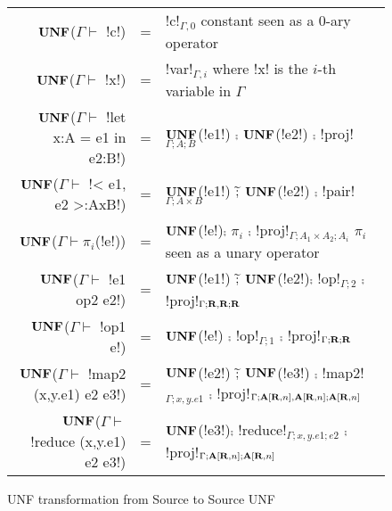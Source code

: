 \begin{figure*}[t]
    \begin{tabular}{r c l}
    $\mathbf{UNF}$($\Gamma\vdash $ !c!) &=& !c!$_{\Gamma,0}$ constant seen as a 0-ary operator\\
    $\mathbf{UNF}$($\Gamma\vdash $ !x!) &=& !var!$_{\Gamma,i}$ where !x! is the $i$-th variable in $\Gamma$ \\
    $\mathbf{UNF}$($\Gamma\vdash $ !let x:A = e1 in e2:B!) &=& $\mathbf{UNF}$(!e1!) $\comp$ $\mathbf{UNF}$(!e2!) $\comp$ !proj!$_{\Gamma;A;B}$  \\ 
    $\mathbf{UNF}$($\Gamma\vdash $ !< e1, e2 >:AxB!) &=& $\mathbf{UNF}$(!e1!) $\widetilde{;}$ $\mathbf{UNF}$(!e2!) $\comp$ !pair!$_{\Gamma;A\times B}$ \\ 
    $\mathbf{UNF}$($\Gamma\vdash \pi_i$(!e!)) &=& $\mathbf{UNF}$(!e!)$\comp $ $\pi_i$ $\comp$ !proj!$_{\Gamma;A_1\times A_2;A_i}$ $\pi_i$ seen as a unary operator\\
    $\mathbf{UNF}$($\Gamma\vdash $ !e1 op2 e2!) &=& $\mathbf{UNF}$(!e1!) $\widetilde{;}$ $\mathbf{UNF}$(!e2!)$\comp$ !op!$_{\Gamma;2}$ $\comp$ !proj!$_{\Gamma;\mathbf{R},\mathbf{R};\mathbf{R}}$ \\
    $\mathbf{UNF}$($\Gamma\vdash $ !op1 e!) &=& $\mathbf{UNF}$(!e!) $\comp$ !op!$_{\Gamma;1}$ $\comp$ !proj!$_{\Gamma;\mathbf{R};\mathbf{R}}$ \\
    $\mathbf{UNF}$($\Gamma\vdash $ !map2 (x,y.e1) e2 e3!) &=& $\mathbf{UNF}$(!e2!) $\widetilde{;}$ $\mathbf{UNF}$(!e3!) $\comp$ !map2!$_{\Gamma; x,y.e1}$ $\comp$ !proj!$_{\Gamma;\mathbf{A}[\mathbf{R},n],\mathbf{A}[\mathbf{R},n];\mathbf{A}[\mathbf{R},n]}$ \\ 
    $\mathbf{UNF}$($\Gamma\vdash $ !reduce (x,y.e1) e2 e3!) &=& $\mathbf{UNF}$(!e3!)$\comp$ !reduce!$_{\Gamma; x,y.e1; e2}$ $\comp$ !proj!$_{\Gamma;\mathbf{A}[\mathbf{R},n];\mathbf{A}[\mathbf{R},n]}$ \\ 
    \end{tabular}
    \caption{UNF transformation from Source to Source UNF}
    \label{fig:source_to_unf}
    \end{figure*}
